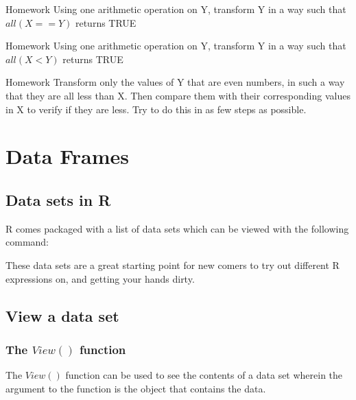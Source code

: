 \begin{DIY}{Homework}
Using one arithmetic operation on Y, transform Y in a way such that $all(X==Y)$ returns TRUE
\end{DIY}

\begin{DIY}{Homework}
Using one arithmetic operation on Y, transform Y in a way such that $all(X<Y)$ returns TRUE
\end{DIY}

\begin{DIY}{Homework}
Transform only the values of Y that are even numbers, in such a way that they are all less than X. Then compare them with their corresponding values in X to verify if they are less. Try to do this in as few steps as possible.
\end{DIY}


\newpage
\section{Data Frames}
\subsection{Data sets in R}
\noindent R comes packaged with a list of data sets which can be viewed with the following command: 
\begin{knitrout}
\color{fgcolor}\begin{kframe}
\begin{alltt}
\hlstd{(} \hlstd{=} \hlstd{)}
\end{alltt}
\end{kframe}
\end{knitrout}
\noindent These data sets are a great starting point for new comers to try out different R expressions on, and getting your hands dirty. 
\subsection{View a data set}
\subsubsection{The $View()$ function}
\noindent The $View()$ function can be used to see the contents of a data set wherein the argument to the function is the object that contains the data.
\begin{knitrout}
\color{fgcolor}\begin{kframe}
\begin{alltt}
 
\end{alltt}
\end{kframe}
\end{knitrout}
